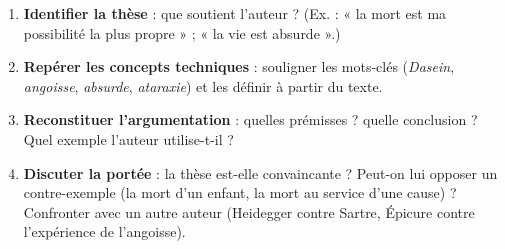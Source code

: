 \documentclass[11pt]{article}
\begin{document}
\begin{methode}
\begin{enumerate}
\item \textbf{Identifier la thèse} : que soutient l'auteur ? (Ex. : « la mort est ma possibilité la plus propre » ; « la vie est absurde ».)
\item \textbf{Repérer les concepts techniques} : souligner les mots-clés (\emph{Dasein}, \emph{angoisse}, \emph{absurde}, \emph{ataraxie}) et les définir à partir du texte.
\item \textbf{Reconstituer l'argumentation} : quelles prémisses ? quelle conclusion ? Quel exemple l'auteur utilise-t-il ?
\item \textbf{Discuter la portée} : la thèse est-elle convaincante ? Peut-on lui opposer un contre-exemple (la mort d'un enfant, la mort au service d'une cause) ? Confronter avec un autre auteur (Heidegger contre Sartre, Épicure contre l'expérience de l'angoisse).
\end{enumerate}
\end{methode}
\end{document}
